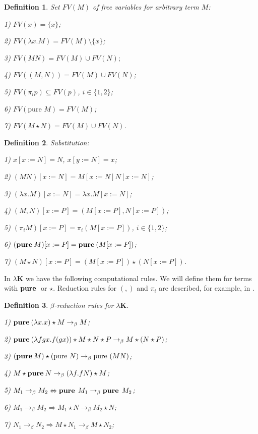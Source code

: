 \documentclass[a4paper]{article}
\newtheorem{defin}{Definition}
\begin{document}
  \begin{defin} Set $FV(M)$ of free variables for arbitrary term $M$:

  1) $FV(x) = \{ x \}$;

  2) $FV(\lambda x. M) = FV(M) \setminus \{ x\}$;

  3) $FV(M N) = FV(M) \cup FV(N);$

  4) $FV((M,N)) = FV(M) \cup FV(N)$;

  5) $FV(\pi_i p) \subseteq FV(p)$, $i \in \{ 1, 2\}$;

  6) $FV(\text{pure } M) = FV(M)$;

  7) $FV(M \star N) = FV(M) \cup FV(N)$.
  \end{defin}

  \begin{defin} Substitution:

  1) $x [x := N] = N$, $x [y := N] = x$;

  2) $(M N) [x := N] = M[x := N] N [x := N]$;

  3) $(\lambda x. M) [x := N] = \lambda x. M [x := N]$;

  4) $(M, N)[x := P] = (M[x := P], N [x := P])$;

  5) $(\pi_i M) [x := P] = \pi_i (M[x := P])$, $i \in \{ 1, 2\}$;

  6) $({\bf pure \: } M) [x := P] = {\bf pure \: } (M [x := P])$;

  7) $(M \star N) [x := P] = (M [x := P]) \star (N [x := P])$.
  \end{defin}

  In $\lambda \textbf{K}$ we have the following computational rules. We will define them for terms with
  ${\bf pure \: }$ or $\star$. Reduction rules for $(,)$ and $\pi_i$ are described, for example, in
  \cite{Pierce}.

  \begin{defin} $\beta$-reduction rules for \emph{$\lambda \textbf{K}$}.

  1) ${\bf pure \: } (\lambda x. x) \star M \rightarrow_{\beta} M$;

  2) ${\bf pure \: } (\lambda f g x. f (g x)) \star M \star N \star P \rightarrow_{\beta} M \star (N \star
  P)$;

  3) $({\bf pure \: } M) \star (\text{pure } N) \rightarrow_{\beta} \text{pure } (M N)$;

  4) $M \star {\bf pure \: } N \rightarrow_{\beta} (\lambda f. f N) \star M$;

  5) $M_1 \rightarrow_{\beta} M_2 \Leftrightarrow {\bf pure \: } \: M_1 \rightarrow_{\beta} {\bf pure \: } \: M_2$;

  6) $M_1 \rightarrow_{\beta} M_2 \Rightarrow M_1 \star N \rightarrow_{\beta} M_2 \star N$;

  7) $N_1 \rightarrow_{\beta} N_2 \Rightarrow M \star N_1 \rightarrow_{\beta} M \star N_2$;
  \end{defin}
\end{document}
